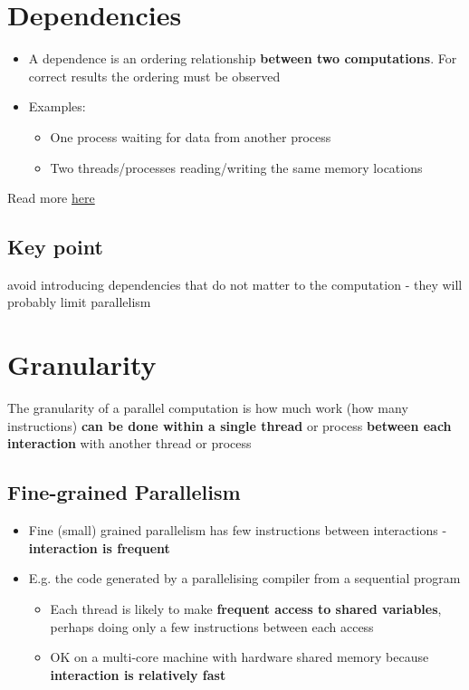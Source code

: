 \documentclass{article}
\begin{document}
\tableofcontents

\newpage

\section{Dependencies}
\begin{itemize}  
  \item A dependence is an ordering relationship \textbf{between two computations}. For correct results the ordering must be observed
  \item Examples:
  \begin{itemize}
    \item One process waiting for data from another process
    \item Two threads/processes reading/writing the same memory locations
  \end{itemize}
\end{itemize}
\begin{flushleft}
Read more \href{https://moodle.nottingham.ac.uk/pluginfile.php/4574828/mod_resource/content/2/L05-Parallel-Concepts.pdf}{here}
\end{flushleft}

\subsection{Key point}
\begin{flushleft}
avoid introducing dependencies that do not matter to the computation - they will probably limit parallelism
\end{flushleft}

\section{Granularity}
\begin{flushleft}
The granularity of a parallel computation is how much work (how many instructions) \textbf{can be done within a single thread} or process \textbf{between each interaction} with another thread or process
\end{flushleft}

\subsection{Fine-grained Parallelism}
\begin{itemize}
  \item Fine (small) grained parallelism has few instructions between interactions - \textbf{interaction is frequent}
  \item E.g. the code generated by a parallelising compiler from a sequential program
  \begin{itemize}
    \item Each thread is likely to make \textbf{frequent access to shared variables}, perhaps doing only a few instructions between each access 
    \item OK on a multi-core machine with hardware shared memory because \textbf{interaction is relatively fast}
  \end{itemize}
\end{itemize}
\end{document}
